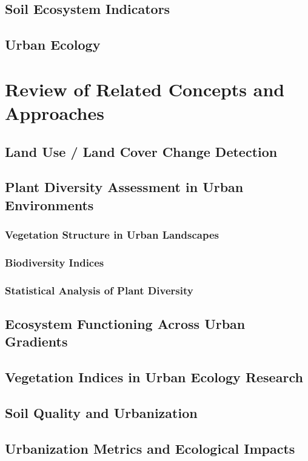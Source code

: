 \subsection{Soil Ecosystem Indicators}
\label{subsection:1-1-8}
\subsection{Urban Ecology}
\label{subsection:1-1-9}
\section{Review of Related Concepts and Approaches}
\label{section:1-2}
\subsection{Land Use / Land Cover Change Detection}
\label{subsection:1-2-1}
\subsection{Plant Diversity Assessment in Urban Environments}
\label{subsection:1-2-2}
\subsubsection{Vegetation Structure in Urban Landscapes}
\label{subsubsection:1-2-2-1}
\subsubsection{Biodiversity Indices}
\label{subsubsection:1-2-2-2}
\subsubsection{Statistical Analysis of Plant Diversity}
\label{subsubsection:1-2-2-3}
\subsection{Ecosystem Functioning Across Urban Gradients}
\label{subsection:1-2-3}
\subsection{Vegetation Indices in Urban Ecology Research}
\label{subsection:1-2-4}
\subsection{Soil Quality and Urbanization}
\label{subsection:1-2-5}
\subsection{Urbanization Metrics and Ecological Impacts}
\label{subsection:1-2-6}
